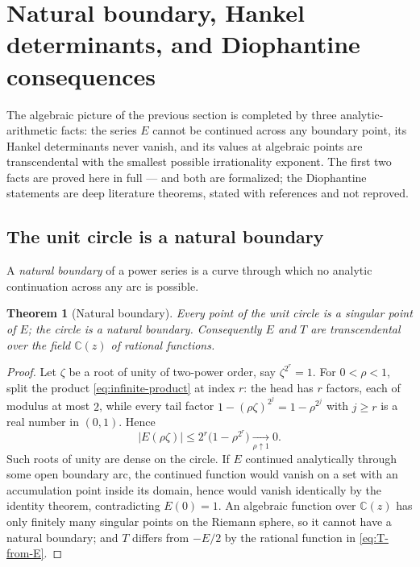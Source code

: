 \documentclass[11pt,oneside]{article}
\numberwithin{equation}{section}
\newtheorem{theorem}{Theorem}[section]
\theoremstyle{definition}
\theoremstyle{remark}
\newcommand{\C}{\mathbb C}
\begin{document}
\section[Natural boundary and Hankel rigidity]{Natural boundary, Hankel determinants, and Diophantine consequences}
\label{sec:boundary-hankel}

The algebraic picture of the previous section is completed by three
analytic-arithmetic facts: the series \(E\) cannot be continued across any
boundary point, its Hankel determinants never vanish, and its values at
algebraic points are transcendental with the smallest possible irrationality
exponent.  The first two facts are proved here in full --- and both are
formalized; the Diophantine statements are deep literature theorems,
stated with references and not reproved.

\subsection{The unit circle is a natural boundary}

A \emph{natural boundary} of a power series is a curve through which no
analytic continuation across any arc is possible.

\begin{theorem}[Natural boundary]
\label{thm:natural-boundary}
Every point of the unit circle is a singular point of \(E\); the circle is a
natural boundary.  Consequently \(E\) and \(T\) are transcendental over the
field \(\C(z)\) of rational functions.
\end{theorem}

\begin{proof}
Let \(\zeta\) be a root of unity of two-power order, say \(\zeta^{2^r}=1\).
For \(0<\rho<1\), split the product \eqref{eq:infinite-product} at index
\(r\): the head has \(r\) factors, each of modulus at most \(2\), while every
tail factor \(1-(\rho\zeta)^{2^j}=1-\rho^{2^j}\) with \(j\ge r\) is a real
number in \((0,1)\).  Hence
\[
 |E(\rho\zeta)|\le2^r\bigl(1-\rho^{2^r}\bigr)
 \xrightarrow[\rho\uparrow1]{}0.
\]
Such roots of unity are dense on the circle.  If \(E\) continued
analytically through some open boundary arc, the continued function would
vanish on a set with an accumulation point inside its domain, hence would
vanish identically by the identity theorem, contradicting \(E(0)=1\).  An
algebraic function over \(\C(z)\) has only finitely many singular points on
the Riemann sphere, so it cannot have a natural boundary; and \(T\) differs
from \(-E/2\) by the rational function in \eqref{eq:T-from-E}.
\end{proof}
\end{document}
